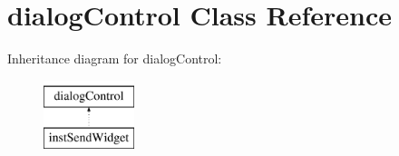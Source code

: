 \hypertarget{classdialogControl}{\section{dialog\-Control \-Class \-Reference}
\label{classdialogControl}
}
\-Inheritance diagram for dialog\-Control\-:\begin{figure}[H]
\begin{center}
\leavevmode
\includegraphics[height=2.000000cm]{classdialogControl}
\end{center}
\end{figure}
